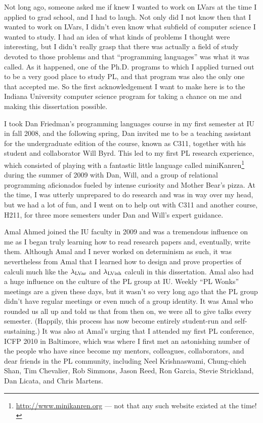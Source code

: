 Not long ago, someone asked me if knew I wanted to work on LVars at
the time I applied to grad school, and I had to laugh.  Not only did I
not know then that I wanted to work on LVars, I didn't even know what
subfield of computer science I wanted to study.  I had an idea of what
kinds of problems I thought were interesting, but I didn't really
grasp that there was actually a field of study devoted to those
problems and that ``programming languages'' was what it was called.
As it happened, one of the Ph.D. programs to which I applied turned
out to be a very good place to study PL, and that program was also the
only one that accepted me.  So the first acknowledgement I want to
make here is to the Indiana University computer science program for
taking a chance on me and making this dissertation possible.

I took Dan Friedman's programming languages course in my first
semester at IU in fall 2008, and the following spring, Dan invited me
to be a teaching assistant for the undergraduate edition of the
course, known as C311, together with his student and collaborator Will
Byrd.  This led to my first PL research experience, which consisted of
playing with a fantastic little language called
miniKanren\footnote{\url{http://www.minikanren.org} --- not that any
such website existed at the time!} during the summer of 2009 with Dan,
Will, and a group of relational programming aficionados fueled by
intense curiosity and Mother Bear's pizza.  At the time, I was utterly
unprepared to do research and was in way over my head, but we had a
lot of fun, and I went on to help out with C311 and another course,
H211, for three more semesters under Dan and Will's expert guidance.

Amal Ahmed joined the IU faculty in 2009 and was a tremendous
influence on me as I began truly learning how to read research papers
and, eventually, write them.  Although Amal and I never worked on
determinism as such, it was nevertheless from Amal that I learned how
to design and prove properties of calculi much like the $\lambda_{\textrm{LVar}}$
and $\lambda_{\textrm{LVish}}$ calculi in this dissertation.  Amal also had a huge
influence on the culture of the PL group at IU.  Weekly ``PL Wonks''
meetings are a given these days, but it wasn't so very long ago that
the PL group didn't have regular meetings or even much of a group
identity.  It was Amal who rounded us all up and told us that from
then on, we were all to give talks every semester.  (Happily, this
process has now become entirely student-run and self-sustaining.)  It
was also at Amal's urging that I attended my first PL conference, ICFP
2010 in Baltimore, which was where I first met an astonishing number
of the people who have since become my mentors, colleagues,
collaborators, and dear friends in the PL community, including Neel
Krishnaswami, Chung-chieh Shan, Tim Chevalier, Rob Simmons, Jason
Reed, Ron Garcia, Stevie Strickland, Dan Licata, and Chris Martens.

